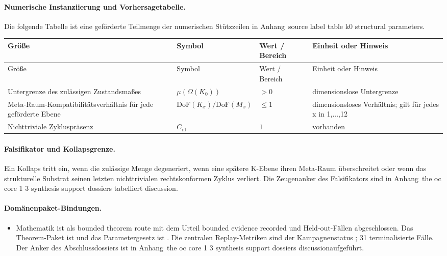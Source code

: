 \paragraph{Numerische Instanziierung und Vorhersagetabelle.}
Die folgende Tabelle ist eine geförderte Teilmenge der numerischen Stützzeilen in Anhang~source label table k0 structural parameters.
\begin{longtable}{@{}L{0.27\textwidth}L{0.15\textwidth}L{0.24\textwidth}L{0.16\textwidth}@{}}
\toprule
Größe & Symbol & Wert / Bereich & Einheit oder Hinweis \\
\midrule
\endfirsthead
\toprule
Größe & Symbol & Wert / Bereich & Einheit oder Hinweis \\
\midrule
\endhead
Untergrenze des zulässigen Zustandsmaßes & $\scriptstyle \mu(\Omega(K_0))$ & $> 0$ & dimensionslose Untergrenze \\
Meta-Raum-Kompatibilitätsverhältnis für jede geförderte Ebene & $\scriptstyle \mathrm{DoF}(K_x)/\allowbreak \mathrm{DoF}(M_x)$ & $\leq 1$ & dimensionsloses Verhältnis; gilt für jedes x in 1,...,12 \\
Nichttriviale Zykluspräsenz & $\scriptstyle C_{\mathrm{nt}}$ & $1$ & vorhanden \\
\bottomrule
\end{longtable}

\paragraph{Falsifikator und Kollapsgrenze.}
Ein Kollaps tritt ein, wenn die zulässige Menge degeneriert, wenn eine spätere K-Ebene ihren Meta-Raum überschreitet oder wenn das strukturelle Substrat seinen letzten nichttrivialen rechtskonformen Zyklus verliert.
Die Zeugenanker des Falsifikators sind in Anhang~the oc core 1 3 synthesis support dossiers tabelliert discussion.

\paragraph{Domänenpaket-Bindungen.}
\begin{itemize}[leftmargin=1.6em,nosep]
\item Mathematik ist als bounded theorem route mit dem Urteil bounded evidence recorded und  Held-out-Fällen abgeschlossen. Das Theorem-Paket ist  und das Parametergesetz ist . Die zentralen Replay-Metriken sind der Kampagnenstatus ; 31 terminalisierte Fälle. Der Anker des Abschlussdossiers ist in Anhang~the oc core 1 3 synthesis support dossiers discussionaufgeführt.
\end{itemize}

